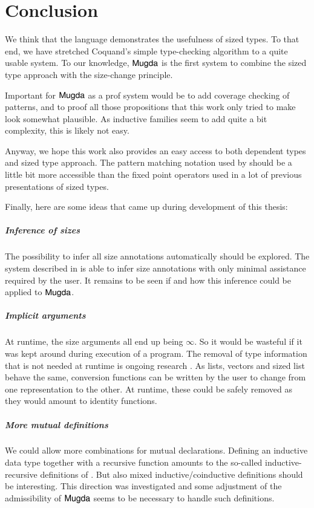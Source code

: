 \chapter{Conclusion}
We think that the \mugda language demonstrates the usefulness of sized types.
To that end, we have stretched Coquand's simple type-checking algorithm to a quite usable system.
To our knowledge, $\textsf{Mugda}$ is the first system to combine the sized type approach with the size-change principle.

Important for $\textsf{Mugda}$ as a prof system would be to add coverage checking of patterns, and to proof all those propositions that this work only tried to make look somewhat plausible. As inductive families seem to add quite a bit complexity, this is likely not easy.

Anyway, we hope this work also provides an easy access to both dependent types and sized type approach. 
The pattern matching notation used by \mugda should be a little bit more accessible than the fixed point operators used in a lot of previous presentations of sized types.

Finally, here are some ideas  that came up during development of this thesis:
\paragraph*{Inference of sizes}
The possibility to infer all size annotations automatically should be explored.
The system described in \cite{bgp:lpar06} is able to infer size annotations with only minimal assistance required by the user. It remains to be seen if and how this inference could be applied to $\textsf{Mugda}$. 
\paragraph*{Implicit arguments}
At runtime, the size arguments all end up being $\infty$.
So it would be wasteful if it was kept around during execution of a program. 
The removal of type information that is not needed at runtime is ongoing research \cite{miquel01implicit,DBLP:conf/types/BradyMM03}. As lists, vectors and sized list behave the same, conversion functions can be written by the user to change from one representation to the other. At runtime, these could be safely removed as they would amount to identity functions.
\paragraph*{More mutual definitions}
We could allow more combinations for mutual declarations.
Defining an inductive data type together with a recursive function amounts to the so-called inductive-recursive definitions of \cite{dybjer01indexed}. But also mixed inductive/coinductive definitions should be interesting. This direction was investigated and some adjustment of the admissibility of $\textsf{Mugda}$ seems to be necessary to handle such definitions.
